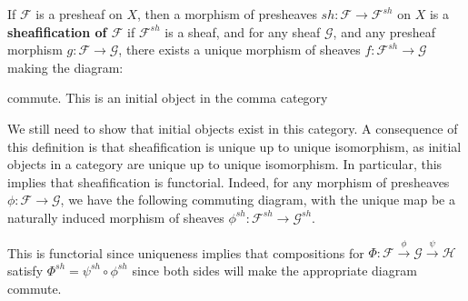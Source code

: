 \begin{definition}
    If $\mathscr{F}$ is a presheaf on $X$, then a morphism of presheaves $sh:\mathscr{F}\rightarrow \mathscr{F}^{sh}$ on $X$ is a \textbf{sheafification of $\mathscr{F}$} if $\mathscr{F}^{sh}$ is a sheaf, and for any sheaf $\mathscr{G}$, and any presheaf morphism $g:\mathscr{F}\rightarrow \mathscr{G}$, there exists a unique morphism of sheaves $f:\mathscr{F}^{sh}\rightarrow \mathscr{G}$ making the diagram: 
    \begin{center}
    \end{center}
    commute. This is an initial object in the comma category 
    \begin{center}
    \end{center}
\end{definition}

We still need to show that initial objects exist in this category. A consequence of this definition is that sheafification is unique up to unique isomorphism, as initial objects in a category are unique up to unique isomorphism. In particular, this implies that sheafification is functorial. Indeed, for any morphism of presheaves $\phi:\mathscr{F}\rightarrow \mathscr{G}$, we have the following commuting diagram, with the unique map be a naturally induced morphism of sheaves $\phi^{sh}:\mathscr{F}^{sh}\rightarrow \mathscr{G}^{sh}$.

\begin{center}
\end{center}
This is functorial since uniqueness implies that compositions for $\Phi:\mathscr{F}\xrightarrow{\phi}\mathscr{G}\xrightarrow{\psi}\mathscr{H}$ satisfy $\Phi^{sh} = \psi^{sh}\circ \phi^{sh}$ since both sides will make the appropriate diagram commute.

